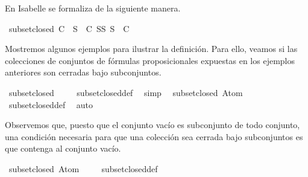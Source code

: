 \begin{isabellebody}
\begin{isamarkuptext}
  En Isabelle se formaliza de la siguiente manera.%
\end{isamarkuptext}\isamarkuptrue%
\isamarkupfalse%
\ {\isachardoublequoteopen}subset{\isacharunderscore}closed\ C\ {\isasymequiv}\ {\isacharparenleft}{\isasymforall}S\ {\isasymin}\ C{\isachardot}\ {\isasymforall}S{\isacharprime}{\isasymsubseteq}S{\isachardot}\ S{\isacharprime}\ {\isasymin}\ C{\isacharparenright}{\isachardoublequoteclose}%
\begin{isamarkuptext}%
Mostremos algunos ejemplos para ilustrar la definición. Para ello, veamos si las colecciones
  de conjuntos de fórmulas proposicionales expuestas en los ejemplos anteriores son cerradas bajo 
  subconjuntos.%
\end{isamarkuptext}\isamarkuptrue%
\isamarkupfalse%
\ {\isachardoublequoteopen}subset{\isacharunderscore}closed\ {\isacharbraceleft}{\isacharbraceleft}{\isacharbraceright}{\isacharbraceright}{\isachardoublequoteclose}\isanewline
%
\isadelimproof
\ \ %
\endisadelimproof
%
\isatagproof
{}\isamarkupfalse%
\ subset{\isacharunderscore}closed{\isacharunderscore}def\ \isamarkupfalse%
\ simp%
\endisatagproof
{\isafoldproof}%
%
\isadelimproof
\isanewline
%
\endisadelimproof
\isanewline
{}\isamarkupfalse%
\ {\isachardoublequoteopen}{\isasymnot}\ subset{\isacharunderscore}closed\ {\isacharbraceleft}{\isacharbraceleft}Atom\ {}{\isacharbraceright}{\isacharbraceright}{\isachardoublequoteclose}\isanewline
%
\isadelimproof
\ \ %
\endisadelimproof
%
\isatagproof
{}\isamarkupfalse%
\ subset{\isacharunderscore}closed{\isacharunderscore}def\ \isamarkupfalse%
\ auto%
\endisatagproof
{\isafoldproof}%
%
\isadelimproof
%
\endisadelimproof
%
\begin{isamarkuptext}%
Observemos que, puesto que el conjunto vacío es subconjunto de todo conjunto, una
  condición necesaria para que una colección sea cerrada bajo subconjuntos es que contenga al
  conjunto vacío.%
\end{isamarkuptext}\isamarkuptrue%
\isamarkupfalse%
\ {\isachardoublequoteopen}subset{\isacharunderscore}closed\ {\isacharbraceleft}{\isacharbraceleft}Atom\ {}{\isacharbraceright}{\isacharcomma}{\isacharbraceleft}{\isacharbraceright}{\isacharbraceright}{\isachardoublequoteclose}\isanewline
%
\isadelimproof
\ \ %
\endisadelimproof
%
\isatagproof
{}\isamarkupfalse%
\ subset{\isacharunderscore}closed{\isacharunderscore}def\ \isamarkupfalse%

\end{isabellebody}
